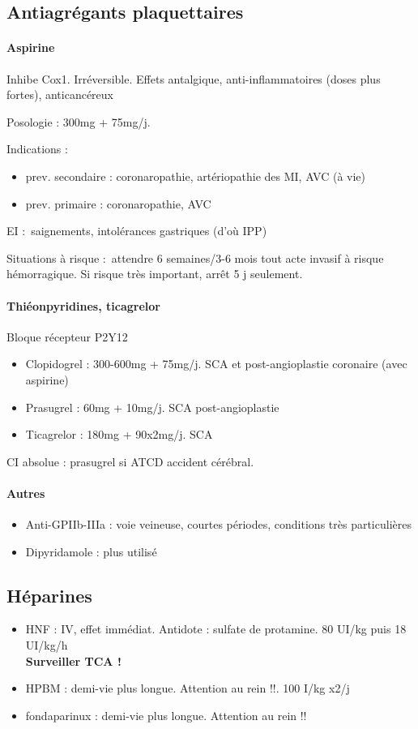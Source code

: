 \documentclass{article}
\begin{document}
\subsection{Antiagrégants plaquettaires}
\paragraph{Aspirine}
Inhibe Cox1. Irréversible. Effets antalgique, anti-inflammatoires (doses plus
fortes), anticancéreux

Posologie : 300mg + 75mg/j.

Indications : 
\begin{itemize}
  \item prev. secondaire : coronaropathie, artériopathie des MI, AVC (à
vie)
\item  prev. primaire : coronaropathie, AVC
\end{itemize}

EI : saignements, intolérances gastriques (d'où IPP)

Situations à risque : attendre 6 semaines/3-6 mois tout acte invasif à risque
hémorragique. Si risque très important, arrêt 5 j seulement.

\paragraph{Thiéonpyridines, ticagrelor}
Bloque récepteur P2Y12
\begin{itemize}
  \item Clopidogrel : 300-600mg + 75mg/j. SCA et post-angioplastie coronaire
    (avec aspirine)
  \item Prasugrel : 60mg + 10mg/j. SCA post-angioplastie 
  \item Ticagrelor : 180mg + 90x2mg/j. SCA 
\end{itemize}

CI absolue : prasugrel si ATCD accident cérébral.

\paragraph{Autres}
\begin{itemize}
  \item Anti-GPIIb-IIIa : voie veineuse, courtes périodes, conditions très particulières
  \item Dipyridamole : plus utilisé
\end{itemize}

\subsection{Héparines}%
\begin{itemize}
  \item HNF : IV, effet immédiat. Antidote : sulfate de protamine. 80 UI/kg puis
    18 UI/kg/h \\
    \textbf{Surveiller TCA !} \danger
  \item HPBM : demi-vie plus longue. Attention au rein !!. 100 I/kg x2/j
  \item fondaparinux : demi-vie plus longue. Attention au rein !!
\end{itemize}
\end{document}
